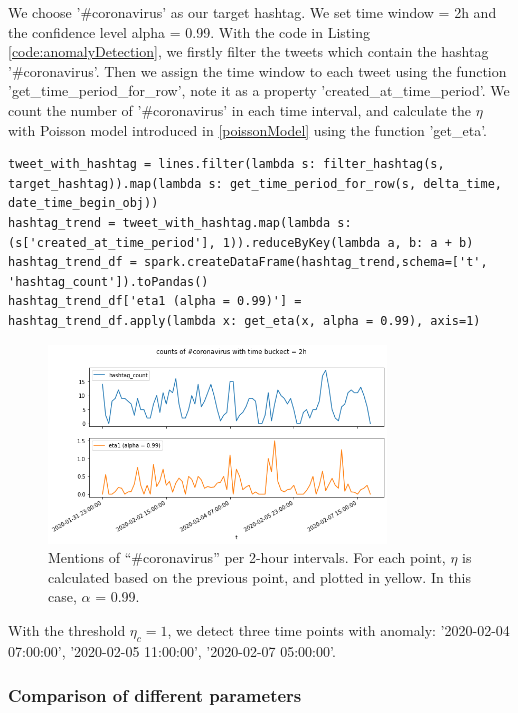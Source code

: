 We choose '\#coronavirus' as our target hashtag. We set time window = 2h and the confidence level alpha = 0.99. With the code in Listing \ref{code:anomalyDetection}, we firstly filter the tweets which contain the hashtag '\#coronavirus'. Then we assign the time window to each tweet using the function 'get\_time\_period\_for\_row', note it as a property 'created\_at\_time\_period'. We count the number of '\#coronavirus' in each time interval, and calculate the $\eta$ with Poisson model introduced in \ref{poissonModel} using the function 'get\_eta'.

\begin{lstlisting}[caption=Anomaly detection of hashtag '\#coronavirus', label={code:anomalyDetection}]
tweet_with_hashtag = lines.filter(lambda s: filter_hashtag(s, target_hashtag)).map(lambda s: get_time_period_for_row(s, delta_time, date_time_begin_obj))
hashtag_trend = tweet_with_hashtag.map(lambda s: (s['created_at_time_period'], 1)).reduceByKey(lambda a, b: a + b)
hashtag_trend_df = spark.createDataFrame(hashtag_trend,schema=['t', 'hashtag_count']).toPandas()
hashtag_trend_df['eta1 (alpha = 0.99)'] = hashtag_trend_df.apply(lambda x: get_eta(x, alpha = 0.99), axis=1)
\end{lstlisting}

\begin{figure}[H]
    \centering
    \includegraphics[width=0.8\textwidth]{images/countsAndEta_coronavirus_2h.png}
    \caption{Mentions of “\#coronavirus” per 2-hour intervals. For each point, $\eta$ is calculated based on the previous point, and plotted in yellow. In this case, $\alpha$ = 0.99.}
    \label{fig:countsAndEta_coronavirus_2h}
\end{figure}

With the threshold $\eta_c = 1$, we detect three time points with  anomaly: '2020-02-04 07:00:00', '2020-02-05 11:00:00', '2020-02-07 05:00:00'.

\subsubsection{Comparison of different parameters}

